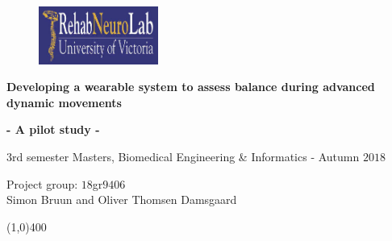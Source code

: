 \clearpage
\thispagestyle{empty}

\begin{figure}[H]
	\hspace{4.5cm}
	\raggedright{
	\includegraphics[width=0.35\textwidth]{setup/RNL.png} }
\end{figure} 

\vspace{3 cm}

\begin{center}
	\begin{Huge}
		\textbf{Developing a wearable system to assess balance during advanced dynamic movements}\\ 
	\end{Huge}
\vspace{5mm}
\begin{Large}
	\textbf{- A pilot study -}\\
\end{Large}
		\vspace{15 mm}
		\begin{Huge}
		3rd semester Masters, Biomedical Engineering \& Informatics - Autumn $2018$\\
		\vspace{3 mm}
	\end{Huge}
	{\Large Project group: $18$gr$9406$} \\
	\vspace{1cm}
	\large{Simon Bruun and Oliver Thomsen Damsgaard}
\end{center}
\vspace*{\fill}

\begin{center}
	\line(1,0){400}
\end{center}

